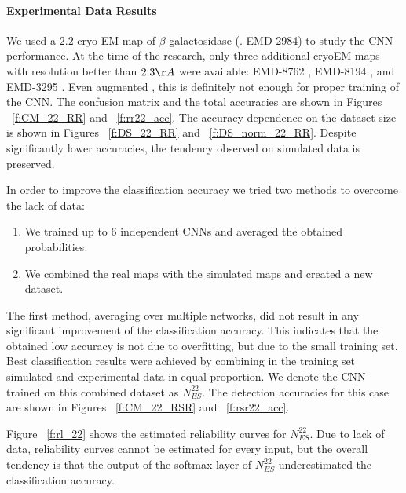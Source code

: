 \paragraph{Experimental Data Results}
We used a $2.2$ cryo-EM map of $\beta$-galactosidase (\cite[]{Bartesaghi2015}. EMD-2984) to study the CNN performance.
At the time of the research, only three additional cryoEM maps with resolution better than $2.3 \AA$ were available: EMD-8762 \cite[]{Dong2017}, EMD-8194 \cite[]{Merk2016}, and EMD-3295 \cite[]{Banerjee2016}.
Even augmented , this is definitely not enough for proper training of the CNN.
The confusion matrix and the total accuracies are shown in Figures ~\ref{f:CM_22_RR} and ~\ref{f:rr22_acc}.
The accuracy dependence on the dataset size is shown in Figures ~\ref{f:DS_22_RR} and ~\ref{f:DS_norm_22_RR}.
Despite significantly lower accuracies, the tendency observed on simulated data is preserved.

In order to improve the classification accuracy we tried two methods to overcome the lack of data:
\begin{enumerate}
\item We trained up to 6 independent CNNs and averaged the obtained probabilities.
\item We combined the real maps with the simulated maps and created  a new dataset.
\end{enumerate}
The first method, averaging over multiple networks, did not result in any significant improvement of the classification accuracy.
This indicates that the obtained low accuracy is not due to overfitting, but due to the small training set.
Best classification results were achieved by combining in the training set simulated and experimental data in equal proportion.
We denote the CNN trained on this combined dataset as $N^{22}_{ES}$.
The detection accuracies for this case are shown in Figures ~\ref{f:CM_22_RSR} and ~\ref{f:rsr22_acc}.

Figure ~\ref{f:rl_22} shows the estimated reliability curves for $N^{22}_{ES}$. 
Due to lack of data, reliability curves cannot be estimated for every input, but the overall tendency is that the output of the softmax layer of $N^{22}_{ES}$ underestimated the classification accuracy.

